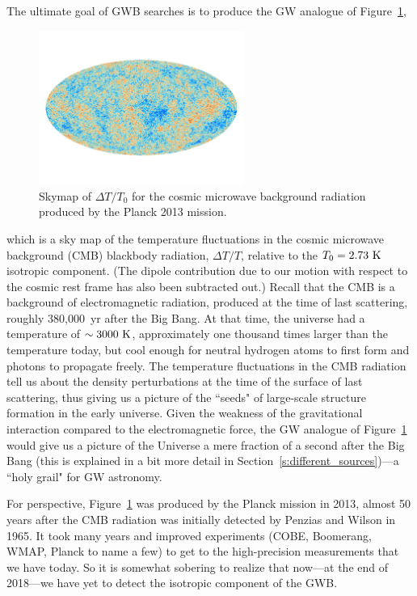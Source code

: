 The ultimate goal of GWB searches is to produce 
the GW analogue of Figure~\ref{f:CMB},
%
\begin{figure}[htbp!]
\begin{center}
\includegraphics[width=0.6\textwidth]{Figures/CMB}
\caption{Skymap of $\Delta T/T_0$ for the cosmic microwave background
radiation produced by the Planck 2013 mission.}
\label{f:CMB}
\end{center}
\end{figure}
%
which is a sky map of the temperature fluctuations in 
the cosmic microwave background (CMB) 
blackbody radiation, $\Delta T/T$, relative 
to the $T_0 = 2.73~{\rm K}$ isotropic component.
(The dipole contribution due to our motion with respect 
to the cosmic rest frame has also been subtracted out.)
Recall that the CMB is a background of electromagnetic
radiation, produced at the time of last scattering,
roughly 380,000~yr after the Big Bang.
At that time, the universe had a temperature of 
$\sim 3000~{\rm K}$, approximately one thousand times 
larger than the temperature today, but cool enough for 
neutral hydrogen atoms to first form and photons to 
propagate freely.
The temperature fluctuations in the CMB radiation tell
us about the density perturbations at the time of 
the surface of last 
scattering, thus giving us a picture of the ``seeds" of 
large-scale structure formation in the early universe.
Given the weakness of the gravitational interaction 
compared to the electromagnetic force, the GW analogue 
of Figure~\ref{f:CMB} would give us a picture of the 
Universe a mere fraction of a second after the Big
Bang (this is explained in a bit more detail in 
Section~\ref{s:different_sources})---a ``holy grail" 
for GW astronomy.

For perspective, Figure~\ref{f:CMB} was produced by 
the Planck mission in 2013,
almost 50 years after the CMB radiation was initially
detected by Penzias and Wilson in 1965.
It took many years and improved experiments
(COBE, Boomerang, WMAP, Planck to name a few) to get to 
the high-precision measurements that we have today.
So it is somewhat sobering to realize that now---at the 
end of 2018---we have yet to detect the isotropic component 
of the GWB.

